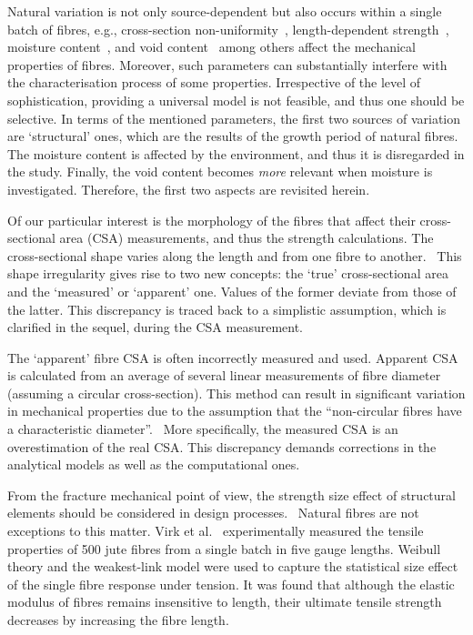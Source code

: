 	Natural variation is not only source-dependent but also occurs within a single batch of fibres, e.g., cross-section non-uniformity~\autocite{AlvesFidelis.2013}, length-dependent strength~\autocite{Virk.2013b}, moisture content~\autocite{Javanbakht.2017b}, and void content~\autocite{Senthilkumar.2018} among others affect the mechanical properties of fibres. Moreover, such parameters can substantially interfere with the characterisation process of some properties. Irrespective of the level of sophistication, providing a universal model is not feasible, and thus one should be selective. In terms of the mentioned parameters, the first two sources of variation are `structural' ones, which are the results of the growth period of natural fibres. The moisture content is affected by the environment, and thus it is disregarded in the study. Finally, the void content becomes \textit{more} relevant when moisture is investigated. Therefore, the first two aspects are revisited herein.
	
	Of our particular interest is the morphology of the fibres that affect their cross-sectional area (CSA) measurements, and thus the strength calculations. The cross-sectional shape varies along the length and from one fibre to another.~\autocite{Virk.2010b} This shape irregularity gives rise to two new concepts: the `true' cross-sectional area and the `measured' or `apparent' one. Values of the former deviate from those of the latter. This discrepancy is traced back to a simplistic assumption, which is clarified in the sequel, during the CSA measurement.
	
	The `apparent' fibre CSA is often incorrectly measured and used. Apparent CSA is calculated from an average of several linear measurements of fibre diameter (assuming a circular cross-section). This method can result in significant variation in mechanical properties due to the assumption that the ``non-circular fibres have a characteristic diameter''.~\autocite{Virk.2013} More specifically, the measured CSA is an overestimation of the real CSA. This discrepancy demands corrections in the analytical models as well as the computational ones.

	From the fracture mechanical point of view, the strength size effect of structural elements should be considered in design processes.~\autocite{Bazant.2000} Natural fibres are not exceptions to this matter. Virk et al.~\autocite{Virk.2013b} experimentally measured the tensile properties of 500 jute fibres from a single batch in five gauge lengths. Weibull theory and the weakest-link model were used to capture the statistical size effect of the single fibre response under tension. It was found that although the elastic modulus of fibres remains insensitive to length, their ultimate tensile strength decreases by increasing the fibre length.
		
